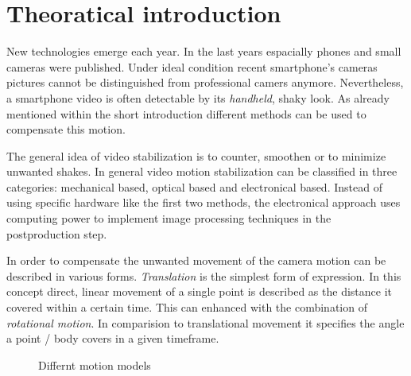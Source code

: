 \section{Theoratical introduction}
New technologies emerge each year. In the last years espacially phones and small cameras were published. Under ideal condition recent smartphone's cameras pictures cannot be distinguished from professional camers anymore. Nevertheless, a smartphone video is often detectable by its \textit{handheld}, shaky look. As already mentioned within the short introduction different methods can be used to compensate this motion.

The general idea of video stabilization is to counter, smoothen or to minimize unwanted shakes. In general video motion stabilization can be classified in three categories: mechanical based, optical based and electronical based. Instead of using specific hardware like the first two methods, the electronical approach uses computing power to implement image processing techniques in the  postproduction step. \cite{blockTang}

In order to compensate the unwanted movement of the camera motion can be described in various forms. \textit{Translation} is the simplest form of expression. In this concept direct, linear movement of a single point is described as the distance it covered within a certain time. This can enhanced with the combination of \textit{rotational motion}.  In comparision to translational movement it specifies the angle a point / body covers in a given timeframe.

\begin{figure}
\begin{subfigure}[c]{0.45\textwidth}
\begin{center}
\end{center}
\end{subfigure}

\begin{subfigure}[c]{0.45\textwidth}
\begin{center}
\end{center}
\end{subfigure}

\caption{Differnt motion models}
\end{figure}







